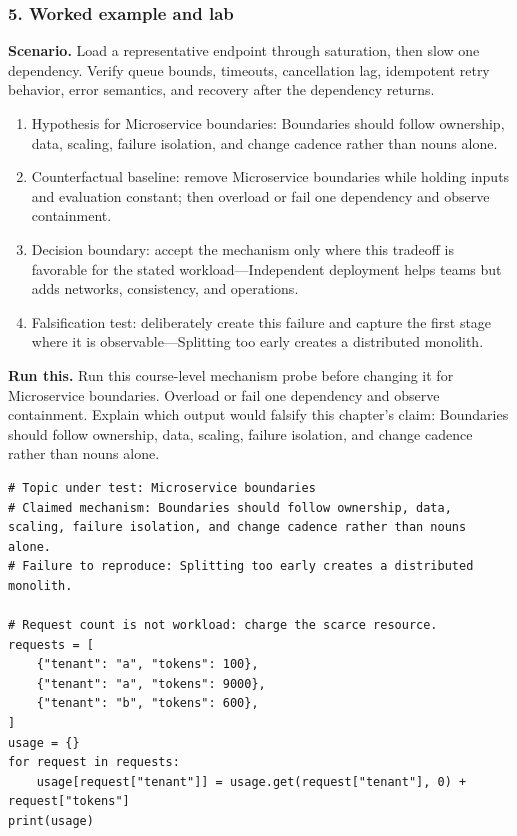 \subsubsection*{5. Worked example and lab}
\textbf{Scenario.} Load a representative endpoint through saturation, then slow one dependency. Verify queue bounds, timeouts, cancellation lag, idempotent retry behavior, error semantics, and recovery after the dependency returns.
\begin{enumerate}
\item Hypothesis for Microservice boundaries: Boundaries should follow ownership, data, scaling, failure isolation, and change cadence rather than nouns alone.
\item Counterfactual baseline: remove Microservice boundaries while holding inputs and evaluation constant; then overload or fail one dependency and observe containment.
\item Decision boundary: accept the mechanism only where this tradeoff is favorable for the stated workload—Independent deployment helps teams but adds networks, consistency, and operations.
\item Falsification test: deliberately create this failure and capture the first stage where it is observable—Splitting too early creates a distributed monolith.
\end{enumerate}
\textbf{Run this.} Run this course-level mechanism probe before changing it for Microservice boundaries. Overload or fail one dependency and observe containment. Explain which output would falsify this chapter's claim: Boundaries should follow ownership, data, scaling, failure isolation, and change cadence rather than nouns alone.
\begin{Verbatim}[fontsize=\scriptsize]
# Topic under test: Microservice boundaries
# Claimed mechanism: Boundaries should follow ownership, data, scaling, failure isolation, and change cadence rather than nouns alone.
# Failure to reproduce: Splitting too early creates a distributed monolith.

# Request count is not workload: charge the scarce resource.
requests = [
    {"tenant": "a", "tokens": 100},
    {"tenant": "a", "tokens": 9000},
    {"tenant": "b", "tokens": 600},
]
usage = {}
for request in requests:
    usage[request["tenant"]] = usage.get(request["tenant"], 0) + request["tokens"]
print(usage)
\end{Verbatim}
